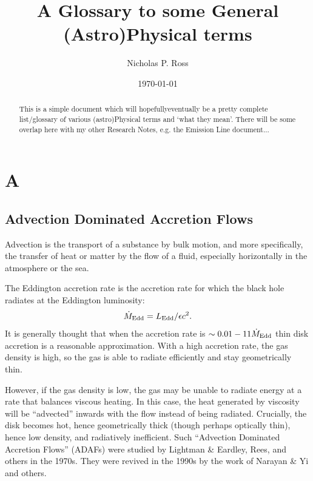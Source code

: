 \documentclass[11pt]{article}
\begin{document}
\title{A Glossary to some General (Astro)Physical terms}
\author{Nicholas P. Ross}
\date{\today}
\maketitle


\begin{abstract}
This is a simple document which will hopefully\/eventually be a pretty
complete list/glossary of various (astro)Physical terms and `what they
mean'. There will be some overlap here with my other Research Notes,
e.g. the Emission Line document...
\end{abstract}



\section*{A}
\subsection*{Advection Dominated Accretion Flows}
Advection is the transport of a substance by bulk motion, 
and more specifically, the transfer of heat or matter by the flow of a fluid,
especially horizontally in the atmosphere or the sea.

The Eddington accretion rate is the accretion rate for which the black
hole radiates at the Eddington luminosity:
\begin{equation} 
    \dot{M}_{\rm Edd} = L_{\rm Edd} /\epsilon c^{2}.
\end{equation} 
It is generally thought that when the accretion rate is $\sim0.01-11
\dot{M}_{\rm Edd}$ thin disk accretion is a reasonable approximation.
With a high accretion rate, the gas density is high, so the gas is
able to radiate efficiently and stay geometrically thin.

However, if the gas density is low, the gas may be unable to radiate
energy at a rate that balances viscous heating.  In this case, the
heat generated by viscosity will be ``advected'' inwards with the flow
instead of being radiated. Crucially, the disk becomes hot, hence geometrically
thick (though perhaps optically thin), hence low density, and
radiatively inefficient.  Such ``Advection Dominated Accretion Flows''
(ADAFs) were studied by Lightman \& Eardley, Rees, and others in the
1970s. They were revived in the 1990s by the work of Narayan \& Yi and
others.
\end{document}
